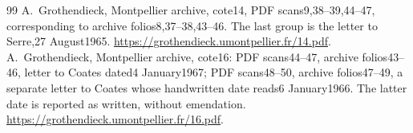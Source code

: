 \begin{thebibliography}{99}
 A.~Grothendieck, Montpellier archive, cote14, PDF scans9,38--39,44--47, corresponding to archive folios8,37--38,43--46. The last group is the letter to Serre,27 August1965. \url{https://grothendieck.umontpellier.fr/14.pdf}.
 A.~Grothendieck, Montpellier archive, cote16: PDF scans44--47, archive folios43--46, letter to Coates dated4 January1967; PDF scans48--50, archive folios47--49, a separate letter to Coates whose handwritten date reads6 January1966. The latter date is reported as written, without emendation. \url{https://grothendieck.umontpellier.fr/16.pdf}.
\end{thebibliography}
